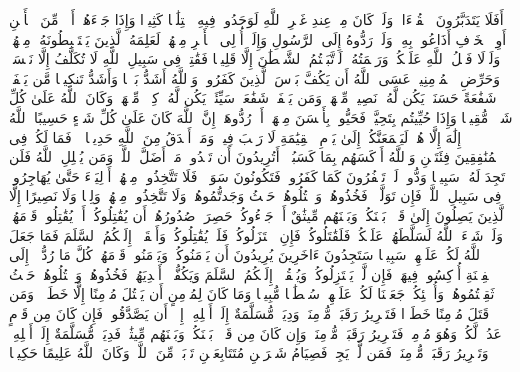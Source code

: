 \stopbuffer
\startbuffer[\q:4:82]
أَفَلَا یَتَدَبَّرُونَ ٱلۡقُرۡءَانَۚ وَلَوۡ كَانَ مِنۡ عِندِ غَیۡرِ ٱللَّهِ لَوَجَدُوا۟ فِیهِ ٱخۡتِلَٰفࣰا كَثِیرࣰا%
\stopbuffer
\startbuffer[\q:4:83]
وَإِذَا جَاۤءَهُمۡ أَمۡرࣱ مِّنَ ٱلۡأَمۡنِ أَوِ ٱلۡخَوۡفِ أَذَاعُوا۟ بِهِۦۖ وَلَوۡ رَدُّوهُ إِلَى ٱلرَّسُولِ وَإِلَىٰۤ أُو۟لِی ٱلۡأَمۡرِ مِنۡهُمۡ لَعَلِمَهُ ٱلَّذِینَ یَسۡتَنۢبِطُونَهُۥ مِنۡهُمۡۗ وَلَوۡلَا فَضۡلُ ٱللَّهِ عَلَیۡكُمۡ وَرَحۡمَتُهُۥ لَٱتَّبَعۡتُمُ ٱلشَّیۡطَٰنَ إِلَّا قَلِیلࣰا%
\stopbuffer
\startbuffer[\q:4:84]
فَقَٰتِلۡ فِی سَبِیلِ ٱللَّهِ لَا تُكَلَّفُ إِلَّا نَفۡسَكَۚ وَحَرِّضِ ٱلۡمُؤۡمِنِینَۖ عَسَى ٱللَّهُ أَن یَكُفَّ بَأۡسَ ٱلَّذِینَ كَفَرُوا۟ۚ وَٱللَّهُ أَشَدُّ بَأۡسࣰا وَأَشَدُّ تَنكِیلࣰا%
\stopbuffer
\startbuffer[\q:4:85]
مَّن یَشۡفَعۡ شَفَٰعَةً حَسَنَةࣰ یَكُن لَّهُۥ نَصِیبࣱ مِّنۡهَاۖ وَمَن یَشۡفَعۡ شَفَٰعَةࣰ سَیِّئَةࣰ یَكُن لَّهُۥ كِفۡلࣱ مِّنۡهَاۗ وَكَانَ ٱللَّهُ عَلَىٰ كُلِّ شَیۡءࣲ مُّقِیتࣰا%
\stopbuffer
\startbuffer[\q:4:86]
وَإِذَا حُیِّیتُم بِتَحِیَّةࣲ فَحَیُّوا۟ بِأَحۡسَنَ مِنۡهَاۤ أَوۡ رُدُّوهَاۤۗ إِنَّ ٱللَّهَ كَانَ عَلَىٰ كُلِّ شَیۡءٍ حَسِیبًا%
\stopbuffer
\startbuffer[\q:4:87]
ٱللَّهُ لَاۤ إِلَٰهَ إِلَّا هُوَۚ لَیَجۡمَعَنَّكُمۡ إِلَىٰ یَوۡمِ ٱلۡقِیَٰمَةِ لَا رَیۡبَ فِیهِۗ وَمَنۡ أَصۡدَقُ مِنَ ٱللَّهِ حَدِیثࣰا%
\stopbuffer
\startbuffer[\q:4:88]
۞ فَمَا لَكُمۡ فِی ٱلۡمُنَٰفِقِینَ فِئَتَیۡنِ وَٱللَّهُ أَرۡكَسَهُم بِمَا كَسَبُوۤا۟ۚ أَتُرِیدُونَ أَن تَهۡدُوا۟ مَنۡ أَضَلَّ ٱللَّهُۖ وَمَن یُضۡلِلِ ٱللَّهُ فَلَن تَجِدَ لَهُۥ سَبِیلࣰا%
\stopbuffer
\startbuffer[\q:4:89]
وَدُّوا۟ لَوۡ تَكۡفُرُونَ كَمَا كَفَرُوا۟ فَتَكُونُونَ سَوَاۤءࣰۖ فَلَا تَتَّخِذُوا۟ مِنۡهُمۡ أَوۡلِیَاۤءَ حَتَّىٰ یُهَاجِرُوا۟ فِی سَبِیلِ ٱللَّهِۚ فَإِن تَوَلَّوۡا۟ فَخُذُوهُمۡ وَٱقۡتُلُوهُمۡ حَیۡثُ وَجَدتُّمُوهُمۡۖ وَلَا تَتَّخِذُوا۟ مِنۡهُمۡ وَلِیࣰّا وَلَا نَصِیرًا%
\stopbuffer
\startbuffer[\q:4:90]
إِلَّا ٱلَّذِینَ یَصِلُونَ إِلَىٰ قَوۡمِۭ بَیۡنَكُمۡ وَبَیۡنَهُم مِّیثَٰقٌ أَوۡ جَاۤءُوكُمۡ حَصِرَتۡ صُدُورُهُمۡ أَن یُقَٰتِلُوكُمۡ أَوۡ یُقَٰتِلُوا۟ قَوۡمَهُمۡۚ وَلَوۡ شَاۤءَ ٱللَّهُ لَسَلَّطَهُمۡ عَلَیۡكُمۡ فَلَقَٰتَلُوكُمۡۚ فَإِنِ ٱعۡتَزَلُوكُمۡ فَلَمۡ یُقَٰتِلُوكُمۡ وَأَلۡقَوۡا۟ إِلَیۡكُمُ ٱلسَّلَمَ فَمَا جَعَلَ ٱللَّهُ لَكُمۡ عَلَیۡهِمۡ سَبِیلࣰا%
\stopbuffer
\startbuffer[\q:4:91]
سَتَجِدُونَ ءَاخَرِینَ یُرِیدُونَ أَن یَأۡمَنُوكُمۡ وَیَأۡمَنُوا۟ قَوۡمَهُمۡ كُلَّ مَا رُدُّوۤا۟ إِلَى ٱلۡفِتۡنَةِ أُرۡكِسُوا۟ فِیهَاۚ فَإِن لَّمۡ یَعۡتَزِلُوكُمۡ وَیُلۡقُوۤا۟ إِلَیۡكُمُ ٱلسَّلَمَ وَیَكُفُّوۤا۟ أَیۡدِیَهُمۡ فَخُذُوهُمۡ وَٱقۡتُلُوهُمۡ حَیۡثُ ثَقِفۡتُمُوهُمۡۚ وَأُو۟لَٰۤئِكُمۡ جَعَلۡنَا لَكُمۡ عَلَیۡهِمۡ سُلۡطَٰنࣰا مُّبِینࣰا%
\stopbuffer
\startbuffer[\q:4:92]
وَمَا كَانَ لِمُؤۡمِنٍ أَن یَقۡتُلَ مُؤۡمِنًا إِلَّا خَطَءࣰاۚ وَمَن قَتَلَ مُؤۡمِنًا خَطَءࣰا فَتَحۡرِیرُ رَقَبَةࣲ مُّؤۡمِنَةࣲ وَدِیَةࣱ مُّسَلَّمَةٌ إِلَىٰۤ أَهۡلِهِۦۤ إِلَّاۤ أَن یَصَّدَّقُوا۟ۚ فَإِن كَانَ مِن قَوۡمٍ عَدُوࣲّ لَّكُمۡ وَهُوَ مُؤۡمِنࣱ فَتَحۡرِیرُ رَقَبَةࣲ مُّؤۡمِنَةࣲۖ وَإِن كَانَ مِن قَوۡمِۭ بَیۡنَكُمۡ وَبَیۡنَهُم مِّیثَٰقࣱ فَدِیَةࣱ مُّسَلَّمَةٌ إِلَىٰۤ أَهۡلِهِۦ وَتَحۡرِیرُ رَقَبَةࣲ مُّؤۡمِنَةࣲۖ فَمَن لَّمۡ یَجِدۡ فَصِیَامُ شَهۡرَیۡنِ مُتَتَابِعَیۡنِ تَوۡبَةࣰ مِّنَ ٱللَّهِۗ وَكَانَ ٱللَّهُ عَلِیمًا حَكِیمࣰا%
